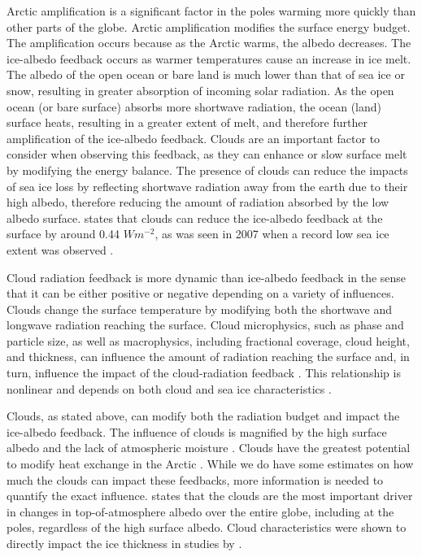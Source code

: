 Arctic amplification is a significant factor in the poles warming more quickly than other parts of the globe. Arctic amplification modifies the surface energy budget. The amplification occurs because as the Arctic warms, the albedo decreases. The ice-albedo feedback occurs as warmer temperatures cause an increase in ice melt. The albedo of the open ocean or bare land is much lower than that of sea ice or snow, resulting in greater absorption of incoming solar radiation. As the open ocean (or bare surface) absorbs more shortwave radiation, the ocean (land) surface heats, resulting in a greater extent of melt, and therefore further amplification of the ice-albedo feedback. Clouds are an important factor to consider when observing this feedback, as they can enhance or slow surface melt by modifying the energy balance. The presence of clouds can reduce the impacts of sea ice loss by reflecting shortwave radiation away from the earth due to their high albedo, therefore reducing the amount of radiation absorbed by the low albedo surface. \citet{hwang:2018} states that clouds can reduce the ice-albedo feedback at the surface by around 0.44 $Wm^{-2}$, as was seen in 2007 when a record low sea ice extent was observed \citep{hwang:2018, sledd:2019}.

Cloud radiation feedback is more dynamic than ice-albedo feedback in the sense that it can be either positive or negative depending on a variety of influences. Clouds change the surface temperature by modifying both the shortwave and longwave radiation reaching the surface. Cloud microphysics, such as phase and particle size, as well as macrophysics, including fractional coverage, cloud height, and thickness, can influence the amount of radiation reaching the surface and, in turn, influence the impact of the cloud-radiation feedback \citep{uttal:2002}. This relationship is nonlinear and depends on both cloud and sea ice characteristics \citep{intrieri:2002}.

Clouds, as stated above, can modify both the radiation budget and impact the ice-albedo feedback. The influence of clouds is magnified by the high surface albedo and the lack of atmospheric moisture \citep{shupe:2003}. Clouds have the greatest potential to modify heat exchange in the Arctic \citep{intrieri:2002}. While we do have some estimates on how much the clouds can impact these feedbacks, more information is needed to quantify the exact influence. \citet{sledd:2019} states that the clouds are the most important driver in changes in top-of-atmosphere albedo over the entire globe, including at the poles, regardless of the high surface albedo. Cloud characteristics were shown to directly impact the ice thickness in studies by \citet{curry:1992, beesley:2007}.  

